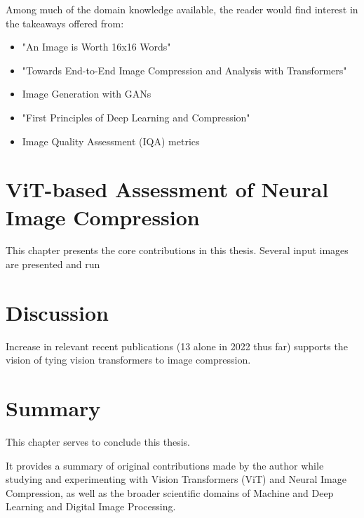 \documentclass[pdftex,11pt,titlepage,twoside,openright]{report}
\begin{document}
Among much of the domain knowledge available, the reader would find interest in the 
takeaways offered from:

\begin{itemize}
	\item "An Image is Worth 16x16 Words" \citep{dosovitskiy2020vit}
	\item "Towards End-to-End Image Compression and Analysis with Transformers" 

    \citep{Bai2022AAAI}
    \item Image Generation with GANs
	\item "First Principles of Deep Learning and Compression" \citep{Principles}
	\item Image Quality Assessment (IQA) metrics
    
    \citep{Metrics}
\end{itemize}

\ThinHRule

\newpage


\chapter{ViT-based Assessment of Neural Image Compression}


This chapter presents the core contributions in this thesis. Several input images
are presented and run

\ThinHRule

\newpage



\chapter{Discussion}

Increase in relevant recent publications (13 alone in 2022 thus far) supports the vision of tying 
vision transformers to image compression.

\ThinHRule

\newpage


\chapter{Summary}

This chapter serves to conclude this thesis. 

It provides a summary 
of original contributions made by the author while studying and experimenting 
with Vision Transformers (ViT) and Neural Image Compression, as well as the broader 
scientific domains of Machine and Deep Learning and Digital Image Processing. 
\end{document}
